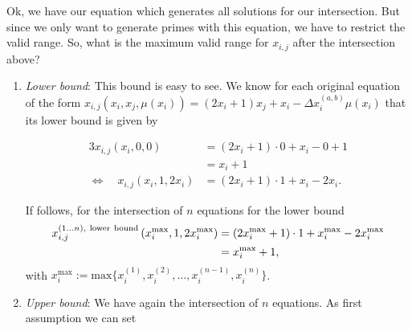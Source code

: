 Ok, we have our equation which generates all solutions for our intersection. But since we only want to generate primes with this equation, we have to restrict the valid range. So, what is the maximum valid range for $x_{i,j}$ after the intersection above?

\begin{enumerate}
	\item \textit{Lower bound}: This bound is easy to see. We know for each original equation of the form $x_{i,j}\left(x_{i},x_{j},\mu\left(x_{i}\right)\right) = \left(2x_{i} + 1\right)x_{j} + x_{i} - \Delta x_{i}^{\left(a,b\right)}\mu\left(x_{i}\right)$ that its lower bound is given by 
	
	\begin{alignat}{3}
	x_{i,j}\left(x_{i},0,0\right) &= \left(2x_{i} + 1\right) \cdot 0 + x_{i} - 0  + 1 \label{eq:lowerbound1} \\
	&= x_{i} + 1 \label{eq:lowerbound2} \\
	\Leftrightarrow \quad x_{i,j}\left(x_{i},1,2x_{i}\right) &= \left(2x_{i} + 1\right) \cdot 1 + x_{i} - 2x_{i}. \label{eq:lowerbound3}
	\end{alignat}
	
	If follows, for the intersection of $n$ equations for the lower bound
	\begin{alignat}{3}
		x_{i,j}^{\left(1 \dots n\right), \ \mathrm{lower \ bound}}\left(x_{i}^{\mathrm{max}},1,2x_{i}^{\mathrm{max}}\right) &= \left(2x_{i}^{\mathrm{max}} + 1\right) \cdot 1 + x_{i}^{\mathrm{max}} - 2x_{i}^{\mathrm{max}} \notag \\
		&= x_{i}^{\mathrm{max}} + 1, \label{eq:lowerbound_neqs}
	\end{alignat}
	with $x_{i}^{\mathrm{max}} := \mathrm{max}\{ x_{i}^{\left(1\right)}, x_{i}^{\left(2\right)}, \dots, x_{i}^{\left(n-1\right)}, x_{i}^{\left(n\right)} \}$.

	\item \textit{Upper bound}: We have again the intersection of $n$ equations. As first assumption we can set
	

\end{enumerate}
